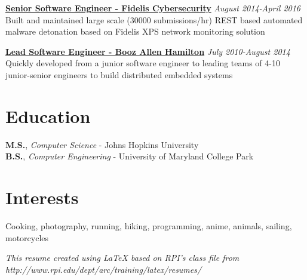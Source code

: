 \documentclass[line]{res}
\begin{document}
\begin{resume}
{\bf \underline{Senior Software Engineer - Fidelis Cybersecurity}} \hfill {\sl August 2014-April 2016}\\[2pt]
Built and maintained large scale (30000 submissions/hr) REST based automated malware detonation based on Fidelis XPS network monitoring solution

{\bf \underline{Lead Software Engineer - Booz Allen Hamilton}} \hfill {\sl July 2010-August 2014}\\[2pt]
Quickly developed from a junior software engineer to leading teams of 4-10 junior-senior engineers to build distributed embedded systems

\vspace{0.1in}
\section{{Education}} 
\vspace{1pt} 
{\bf M.S.}, {\sl Computer Science}  - Johns Hopkins University \\
{\bf B.S.}, {\sl Computer Engineering} - University of Maryland College Park
 
\vspace{0.1in}
\section{{Interests}} 
\vspace{-5pt} 
\begin{center}
Cooking, photography, running, hiking, programming, anime,  animals, sailing, motorcycles

\vspace{.05in}
{\tiny {\sl This resume created using LaTeX based on RPI's class file from http://www.rpi.edu/dept/arc/training/latex/resumes/}}
\end{center} 
 
\end{resume} 
\end{document}
